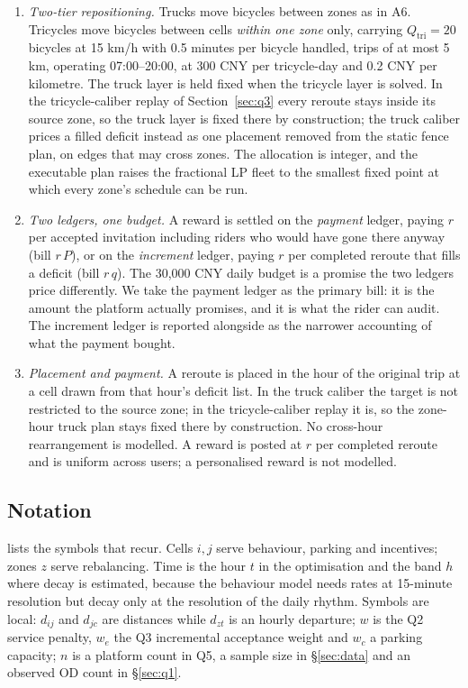 \begin{enumerate}[label=\textbf{A\arabic*.},leftmargin=2.4em]
\item \emph{Two-tier repositioning.} Trucks move bicycles between zones as in A6.
  Tricycles move bicycles between cells \emph{within one zone} only, carrying
  $Q_{\text{tri}}=20$ bicycles at 15 km/h with 0.5 minutes per bicycle handled, trips
  of at most 5 km, operating 07:00--20:00, at 300 CNY per tricycle-day and 0.2 CNY
  per kilometre. The truck layer is held fixed when the tricycle layer is solved. In the
  tricycle-caliber replay of Section~\ref{sec:q3} every reroute stays inside its source
  zone, so the truck layer is fixed there by construction; the truck caliber prices a
  filled deficit instead as one placement removed from the static fence plan, on edges
  that may cross zones. The allocation is integer, and the executable plan
  raises the fractional LP fleet to the smallest fixed point at which every zone's
  schedule can be run.

\item \emph{Two ledgers, one budget.} A reward is settled on the \emph{payment}
  ledger, paying $r$ per accepted invitation including riders who would have gone there
  anyway (bill $r\,P$), or on the \emph{increment} ledger, paying $r$ per completed
  reroute that fills a deficit (bill $r\,q$). The 30,000 CNY daily budget is a promise
  the two ledgers price differently. We take the payment ledger as the primary bill: it
  is the amount the platform actually promises, and it is what the rider can audit. The
  increment ledger is reported alongside as the narrower accounting of what the payment
  bought.

\item \emph{Placement and payment.} A reroute is placed in the hour of the original
  trip at a cell drawn from that hour's deficit list. In the truck caliber the target is
  not restricted to the source zone; in the tricycle-caliber replay it is, so the
  zone-hour truck plan stays fixed there by construction. No cross-hour rearrangement is
  modelled. A reward is posted at $r$ per completed reroute and is uniform across users;
  a personalised reward is not modelled.
\end{enumerate}

\subsection{Notation}

 lists the symbols that recur. Cells $i,j$ serve behaviour,
parking and incentives; zones $z$ serve rebalancing. Time is the hour $t$ in the
optimisation and the band $h$ where decay is estimated, because the behaviour model
needs rates at 15-minute resolution but decay only at the resolution of the daily
rhythm. Symbols are local: $d_{ij}$ and $d_{jc}$ are distances while $d_{zt}$ is an
hourly departure; $w$ is the Q2 service penalty, $w_e$ the Q3 incremental acceptance
weight and $w_c$ a parking capacity; $n$ is a platform count in Q5, a sample size in
\S\ref{sec:data} and an observed OD count in \S\ref{sec:q1}.

